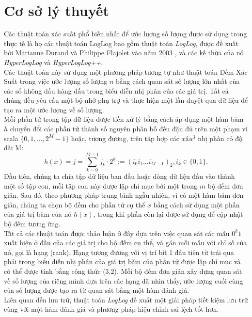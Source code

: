 \documentclass[letterpaper,13pt]{article}
\theoremstyle{mytheor}
\begin{document}
\section{Cơ sở lý thuyết}
Các thuật toán xác suất phổ biến nhất để ước lượng số lượng được sử dụng trong thực tế là họ các thuật toán LogLog bao gồm thuật toán \textit{LogLog}, 
được đề xuất bởi Marianne Durand và Philippe Flajolet vào năm 2003 \cite{durand2003loglog}, và các kế thừa của nó \textit{HyperLogLog} và \textit{HyperLogLog++}.\\
Các thuật toán này sử dụng một phương pháp tương tự như thuật toán Đếm Xác Suất trong việc ước lượng số lượng $n$ bằng cách quan sát số lượng lớn nhất 
của các số không dấu hàng đầu trong biểu diễn nhị phân của các giá trị. Tất cả chúng đều yêu cầu một bộ nhớ phụ trợ và thực hiện một lần duyệt qua dữ liệu 
để tạo ra một ước lượng về số lượng.\\
Mỗi phần tử trong tập dữ liệu được tiền xử lý bằng cách áp dụng một hàm băm $h$ chuyển đổi các phần tử thành số nguyên phân bố đều đặn đủ 
trên một phạm vi scala $\{0,1,...,2^M-1\}$ hoặc, tương đương, trên tập hợp các $xâu^3$ nhị phân có độ dài M:
\[
    h(x) = j = \sum\limits_{k=0}^{M-1}j_k\cdot2^k := \left(i_0i_1...i_{M-1}\right)_2,i_k \in \{0,1\}.    
\]
\indent Đầu tiên, chúng ta chia tập dữ liệu ban đầu hoặc dòng dữ liệu đầu vào thành một số tập con, mỗi tập con này được lập chỉ mục bởi một trong $m$ bộ đếm đơn giản. 
Sau đó, theo phương pháp trung bình ngẫu nhiên, vì có một hàm băm đơn giản, chúng ta chọn bộ đếm cho phần tử cụ thể $x$ bằng cách sử dụng một phần của 
giá trị băm của nó $h(x)$, trong khi phần còn lại được sử dụng để cập nhật bộ đếm tương ứng.\\
Tất cả các thuật toán được thảo luận ở đây dựa trên việc quan sát các mẫu $0^k1$ xuất hiện ở đầu của các giá trị cho bộ đếm cụ thể, và gán mỗi mẫu 
với chỉ số của nó, gọi là hạng (rank). Hạng tương đương với vị trí bit 1 đầu tiên từ trái qua phải trong biểu diễn nhị phân của giá trị băm của phần tử được lập chỉ mục 
và có thể được tính bằng công thức (3.2). Mỗi bộ đếm đơn giản xây dựng quan sát về số lượng của riêng mình dựa trên các hạng đã nhìn thấy, ước lượng 
cuối cùng của số lượng được tạo ra từ quan sát bằng một hàm đánh giá.\\
Liên quan đến lưu trữ, thuật toán \textit{LogLog} đề xuất một giải pháp tiết kiệm lưu trữ cùng với một hàm đánh giá và phương pháp hiệu chỉnh sai lệch tốt hơn.
\end{document}
